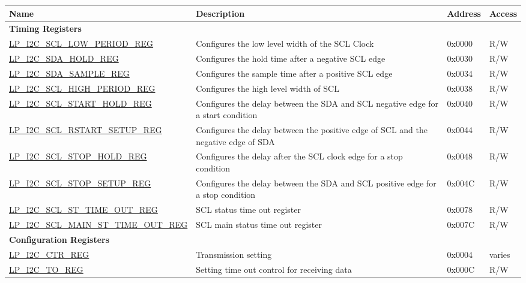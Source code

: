 \begin{longtable}{ | p{6cm} | p{7.2cm} | p{1.3cm} | p{1cm} | }
\hline\rowcolor{lightgray}
Name & Description &  Address & Access \\ \hline
\endhead
\multicolumn{4}{|l|}{\textbf{Timing Registers}} \\ \hline
\hyperref[regdesc:LPI2CSCLLOWPERIODREG]{LP\_I2C\_SCL\_LOW\_PERIOD\_REG} & Configures the low level width of the SCL Clock & 0x0000 & R/W \\ \hline
\hyperref[regdesc:LPI2CSDAHOLDREG]{LP\_I2C\_SDA\_HOLD\_REG} & Configures the hold time after a negative SCL edge & 0x0030 & R/W \\ \hline
\hyperref[regdesc:LPI2CSDASAMPLEREG]{LP\_I2C\_SDA\_SAMPLE\_REG} & Configures the sample time after a positive SCL edge & 0x0034 & R/W \\ \hline
\hyperref[regdesc:LPI2CSCLHIGHPERIODREG]{LP\_I2C\_SCL\_HIGH\_PERIOD\_REG} & Configures the high level width of SCL & 0x0038 & R/W \\ \hline
\hyperref[regdesc:LPI2CSCLSTARTHOLDREG]{LP\_I2C\_SCL\_START\_HOLD\_REG} & Configures the delay between the SDA and SCL negative edge for a start condition & 0x0040 & R/W \\ \hline
\hyperref[regdesc:LPI2CSCLRSTARTSETUPREG]{LP\_I2C\_SCL\_RSTART\_SETUP\_REG} & Configures the delay between the positive edge of SCL and the negative edge of SDA & 0x0044 & R/W \\ \hline
\hyperref[regdesc:LPI2CSCLSTOPHOLDREG]{LP\_I2C\_SCL\_STOP\_HOLD\_REG} & Configures the delay after the SCL clock edge for a stop condition & 0x0048 & R/W \\ \hline
\hyperref[regdesc:LPI2CSCLSTOPSETUPREG]{LP\_I2C\_SCL\_STOP\_SETUP\_REG} & Configures the delay between the SDA and SCL positive edge for a stop condition & 0x004C & R/W \\ \hline
\hyperref[regdesc:LPI2CSCLSTTIMEOUTREG]{LP\_I2C\_SCL\_ST\_TIME\_OUT\_REG} & SCL status time out register & 0x0078 & R/W \\ \hline
\hyperref[regdesc:LPI2CSCLMAINSTTIMEOUTREG]{LP\_I2C\_SCL\_MAIN\_ST\_TIME\_OUT\_REG} & SCL main status time out register & 0x007C & R/W \\ \hline
\multicolumn{4}{|l|}{\textbf{Configuration Registers}} \\ \hline
\hyperref[regdesc:LPI2CCTRREG]{LP\_I2C\_CTR\_REG} & Transmission setting & 0x0004 & varies \\ \hline
\hyperref[regdesc:LPI2CTOREG]{LP\_I2C\_TO\_REG} & Setting time out control for receiving data & 0x000C & R/W \\ \hline

\end{longtable}
